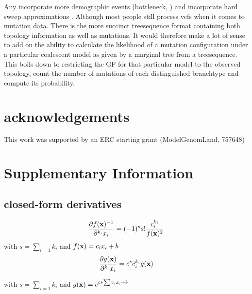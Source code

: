 \documentclass[10pt, a4]{article}
\newcommand{\beginsupplement}{%
        \setcounter{table}{0}
        \renewcommand{\thetable}{S\arabic{table}}%
        \setcounter{figure}{0}
        \renewcommand{\thefigure}{S\arabic{figure}}%
     }
\begin{document}
Any
incorporate more demographic events (bottleneck, ) and incorporate hard sweep approximations \citep{Bisschop2021}.
Although most people still process vcfs when it comes to mutation data. There is the more succinct treesequence format containing both topology information as well as mutations. It would therefore make a lot of sense to add on the ability to calculate the likelihood of a mutation configuration under a particular coalescent model as given by a marginal tree from a treesequence. This boils down to restricting the GF for that particular model to the observed topology, count the number of mutations of each distinguished branchtype and compute its probability.

\section*{acknowledgements}
This work was supported by an ERC starting grant (ModelGenomLand, 757648)


\beginsupplement

\section*{Supplementary Information}
\subsection*{closed-form derivatives}

\begin{equation}
\frac{\partial f(\bold{x})^{-1}}{\partial^{k_i} x_i} = (-1)^s s! \frac{c^{k_i}_i}{f(\bold{x})^2}
\end{equation}
with $s = \sum_{i=1} k_i$ and $f(\bold{x}) = c_i x_i + b$
%
\begin{equation}
\frac{\partial g(\bold{x})}{\partial^{k_i} x_i} = c^sc_i^{k_i}g(\bold{x})	
\end{equation}

with $s = \sum_{i=1} k_i$ and $g(\bold{x}) = e^{c*\sum c_i x_i + b}$

\end{document}
